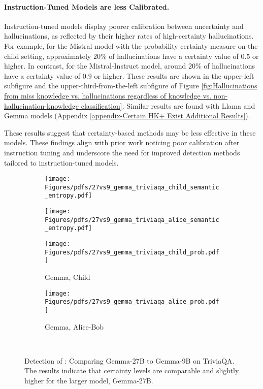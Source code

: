 \paragraph{Instruction-Tuned Models are less Calibrated.}
Instruction-tuned models display poorer calibration between uncertainty and hallucinations, as reflected by their higher rates of high-certainty hallucinations. 
For example, for the Mistral model with the probability certainty measure on the child setting, approximately $20\%$ of hallucinations have a certainty value of $\mathbf{0.5}$ or higher. In contrast, for the Mistral-Instruct model, around $20\%$ of hallucinations have a certainty value of $\mathbf{0.9}$ or higher. These results are shown in the upper-left subfigure and the upper-third-from-the-left subfigure of Figure \ref{fig:Hallucinations from miss knowledge vs. hallucinations regardless of knowledge vs. non-hallucination-knowledge classification}.
Similar results are found with Llama and Gemma models (Appendix \ref{appendix-Certain HK+ Exist Additional Results}).

These results suggest that certainty-based methods may be less effective in these models. These findings align with prior work noticing poor calibration after instruction tuning \citep{gpt4} and underscore the need for improved detection methods tailored to instruction-tuned models.








\begin{figure}
\centering
\begin{subfigure}[b]{0.23\textwidth}
  \centering
  \texttt{[image: Figures/pdfs/27vs9\_gemma\_triviaqa\_child\_semantic\_entropy.pdf]}
 \end{subfigure}%
 \hfill
  \centering
\begin{subfigure}[b]{0.23\textwidth}
  \centering
  \texttt{[image: Figures/pdfs/27vs9\_gemma\_triviaqa\_alice\_semantic\_entropy.pdf]}
 \end{subfigure}
 \hfill
\centering
\begin{subfigure}[b]{0.23\textwidth}
  \centering
  \texttt{[image: Figures/pdfs/27vs9\_gemma\_triviaqa\_child\_prob.pdf]}
  \caption{Gemma, Child}
  \end{subfigure}
  \hfill
  \centering
  \begin{subfigure}[b]{0.23\textwidth}
  \centering
  \texttt{[image: Figures/pdfs/27vs9\_gemma\_triviaqa\_alice\_prob.pdf]}
  \caption{Gemma, Alice-Bob}
 \end{subfigure}\\

 \caption{
Detection of \chk: Comparing Gemma-27B to Gemma-9B on TriviaQA. The results indicate that certainty levels are comparable and slightly higher for the larger model, Gemma-27B.}
 \label{fig:Hallucinations gemma}
\end{figure}


